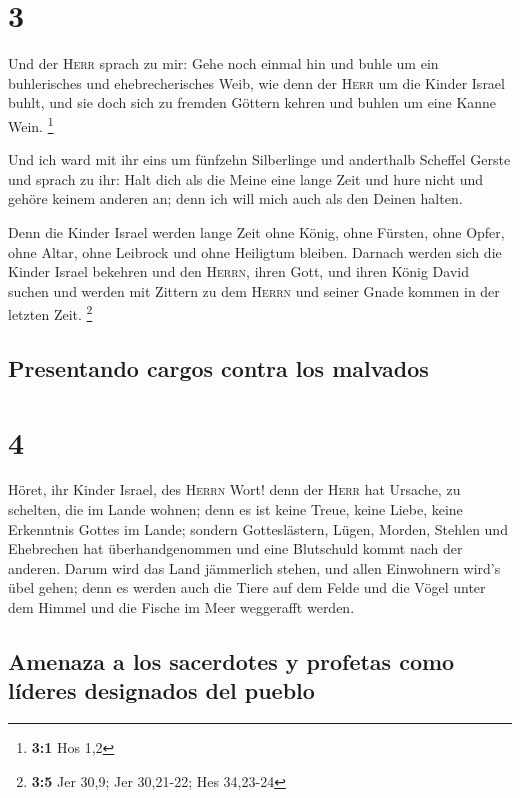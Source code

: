 \hypertarget{section-2}{%
\section{3}\label{section-2}}

 Und der \textsc{Herr} sprach zu mir: Gehe noch einmal hin
und buhle um ein buhlerisches und ehebrecherisches Weib, wie denn der
\textsc{Herr} um die Kinder Israel buhlt, und sie doch sich zu fremden
Göttern kehren und buhlen um eine Kanne Wein. \footnote{\textbf{3:1} Hos
  1,2}

 Und ich ward mit ihr eins um fünfzehn Silberlinge und
anderthalb Scheffel Gerste  und sprach zu ihr: Halt dich
als die Meine eine lange Zeit und hure nicht und gehöre keinem anderen
an; denn ich will mich auch als den Deinen halten.

 Denn die Kinder Israel werden lange Zeit ohne König, ohne
Fürsten, ohne Opfer, ohne Altar, ohne Leibrock und ohne Heiligtum
bleiben.  Darnach werden sich die Kinder Israel bekehren
und den \textsc{Herrn}, ihren Gott, und ihren König David suchen und
werden mit Zittern zu dem \textsc{Herrn} und seiner Gnade kommen in der
letzten Zeit. \footnote{\textbf{3:5} Jer 30,9; Jer 30,21-22; Hes
  34,23-24}

\hypertarget{presentando-cargos-contra-los-malvados}{%
\subsection{Presentando cargos contra los
malvados}\label{presentando-cargos-contra-los-malvados}}

\hypertarget{section-3}{%
\section{4}\label{section-3}}

 Höret, ihr Kinder Israel, des \textsc{Herrn} Wort! denn
der \textsc{Herr} hat Ursache, zu schelten, die im Lande wohnen; denn es
ist keine Treue, keine Liebe, keine Erkenntnis Gottes im Lande;
 sondern Gotteslästern, Lügen, Morden, Stehlen und
Ehebrechen hat überhandgenommen und eine Blutschuld kommt nach der
anderen.  Darum wird das Land jämmerlich stehen, und allen
Einwohnern wird's übel gehen; denn es werden auch die Tiere auf dem
Felde und die Vögel unter dem Himmel und die Fische im Meer weggerafft
werden.

\hypertarget{amenaza-a-los-sacerdotes-y-profetas-como-luxedderes-designados-del-pueblo}{%
\subsection{Amenaza a los sacerdotes y profetas como líderes designados
del
pueblo}\label{amenaza-a-los-sacerdotes-y-profetas-como-luxedderes-designados-del-pueblo}}

